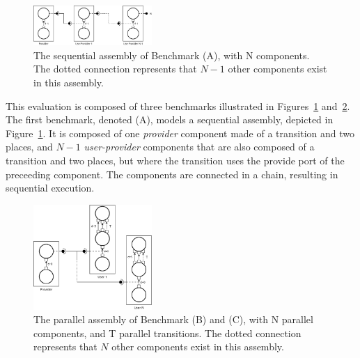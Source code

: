 
\begin{figure}[h]
  \begin{center}
    \includegraphics[width=0.4\textwidth]{./images/seq.pdf}
    \caption{The \mad sequential assembly of Benchmark (A), with N components. The dotted connection represents that $N-1$ other components exist in this assembly.}
    \label{fig:seq}
  \end{center}
\end{figure}

This evaluation is composed of three benchmarks illustrated in
Figures~\ref{fig:seq} and~\ref{fig:par}.
The first benchmark, denoted (A), models a sequential \mad assembly,
depicted in Figure~\ref{fig:seq}. It is composed of one
\emph{provider} component made of a transition and two places, and
$N-1$ \emph{user-provider} components that are also composed of a
transition and two places, but where the transition uses the provide
port of the preceeding component. The components are connected in
a chain, resulting in sequential execution.

\begin{figure}[h]
  \begin{center}
    \includegraphics[width=0.4\textwidth]{./images/par.pdf}
    \caption{The \mad parallel assembly of Benchmark (B) and (C), with N parallel components, and T parallel transitions. The dotted connection represents that $N$ other components exist in this assembly.}
    \label{fig:par}
  \end{center}
\end{figure}

